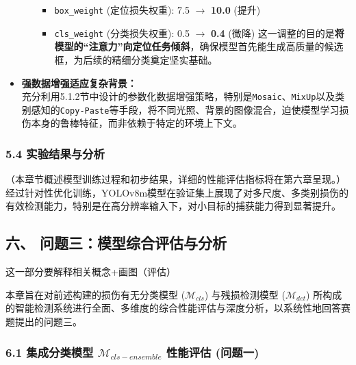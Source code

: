 \documentclass[
]{article}
\begin{document}
\begin{itemize}
\begin{enumerate}
    \begin{itemize}
    \item
      \texttt{box\_weight} (定位损失权重): 7.5 \(\rightarrow\)
      \textbf{10.0} (提升)
    \item
      \texttt{cls\_weight} (分类损失权重): 0.5 \(\rightarrow\)
      \textbf{0.4} (微降)
      这一调整的目的是\textbf{将模型的``注意力''向定位任务倾斜}，确保模型首先能生成高质量的候选框，为后续的精细分类奠定坚实基础。
    \end{itemize}
  \end{enumerate}
\item
  \textbf{强数据增强适应复杂背景：} \\
  充分利用5.1.2节中设计的参数化数据增强策略，特别是\texttt{Mosaic}、\texttt{MixUp}以及类别感知的\texttt{Copy-Paste}等手段，将不同光照、背景的图像混合，迫使模型学习损伤本身的鲁棒特征，而非依赖于特定的环境上下文。
\end{itemize}

\subsubsection{\texorpdfstring{\textbf{5.4
实验结果与分析}}{5.4 实验结果与分析}}\label{54-ux5b9eux9a8cux7ed3ux679cux4e0eux5206ux6790}

（本章节概述模型训练过程和初步结果，详细的性能评估指标将在第六章呈现。）
经过针对性优化训练，YOLOv8m模型在验证集上展现了对多尺度、多类别损伤的有效检测能力，特别是在高分辨率输入下，对小目标的捕获能力得到显著提升。

\subsection{六、
问题三：模型综合评估与分析}\label{ux516d-ux95eeux9898ux4e09ux6a21ux578bux7efcux5408ux8bc4ux4f30ux4e0eux5206ux6790}

这一部分要解释相关概念+画图（评估）

本章旨在对前述构建的损伤有无分类模型 (\(\mathcal{M}_{cls}\))
与残损检测模型 (\(\mathcal{M}_{det}\))
所构成的智能检测系统进行全面、多维度的综合性能评估与深度分析，以系统性地回答赛题提出的问题三。

\subsubsection{\texorpdfstring{\textbf{6.1 集成分类模型
\(\mathcal{M}_{cls-ensemble}\) 性能评估
(问题一)}}{6.1 集成分类模型 \textbackslash mathcal\{M\}\_\{cls-ensemble\} 性能评估 (问题一)}}\label{61-ux96c6ux6210ux5206ux7c7bux6a21ux578b--ux1d440-ux1d450-ux1d459-ux1d460-ux2212-ux1d452-ux1d45b-ux1d460-ux1d452-ux1d45a-ux1d44f-ux1d459-ux1d452--ux6027ux80fdux8bc4ux4f30-ux95eeux9898ux4e00}
\end{document}
